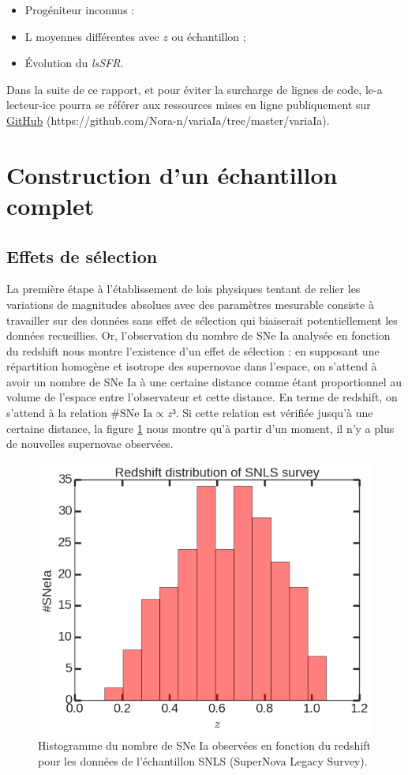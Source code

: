 \documentclass[a4paper, 12pt, svgnames]{article}
\begin{document}
\begin{itemize}
    \item Progéniteur inconnus :
    \item L moyennes différentes avec $z$ ou échantillon ;
    \item Évolution du \textit{lsSFR}.
\end{itemize}

Dans la suite de ce rapport, et pour éviter la surcharge de lignes de code, le-a
lecteur-ice pourra se référer aux ressources mises en ligne publiquement sur
\href{https://github.com/Nora-n/variaIa/tree/master/variaIa}{GitHub}
(https://github.com/Nora-n/variaIa/tree/master/variaIa).

\section{Construction d'un échantillon complet}\label{sec:complet}
\subsection{Effets de sélection}\label{ssec:selec}
La première étape à l'établissement de lois physiques tentant de relier les
variations de magnitudes absolues avec des paramètres mesurable consiste à
travailler sur des données sans effet de sélection qui biaiserait
potentiellement les données recueillies. Or, l'observation du nombre de SNe Ia
analysée en fonction du redshift nous montre l'existence d'un effet de sélection
: en supposant une répartition homogène et isotrope des supernovae dans
l'espace, on s'attend à avoir un nombre de SNe Ia à une certaine distance comme
étant proportionnel au volume de l'espace entre l'observateur et cette distance.
En terme de redshift, on s'attend à la relation $\#\text{SNe Ia} \propto z³$. Si
cette relation est vérifiée jusqu'à une certaine distance, la figure
\ref{redshift_miss} nous montre qu'à partir d'un moment, il n'y a plus de
nouvelles supernovae observées.

\begin{figure}[htbp!]
    \centering
    \includegraphics[width=.5\linewidth]{Rapport_figures/redshift_miss.png}
    \captionsetup{justification=centering}
    \caption{Histogramme du nombre de SNe Ia observées en fonction du redshift
    pour les données de l'échantillon SNLS (SuperNova Legacy Survey).}
    \label{redshift_miss}
\end{figure}
\end{document}
